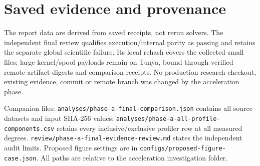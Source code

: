 \documentclass[11pt,a4paper]{article}
\begin{document}
\section{Saved evidence and provenance}
The report data are derived from saved receipts, not rerun solvers. The independent final review qualifies execution/internal parity as passing and retains the separate global scientific failure. Its local rehash covers the collected small files; large kernel/spool payloads remain on Tunya, bound through verified remote artifact digests and comparison receipts. No production research checkout, existing evidence, commit or remote branch was changed by the acceleration phase.

Companion files: \texttt{analyses/phase-a-final-comparison.json} contains all source datasets and input SHA-256 values; \texttt{analyses/phase-a-all-profile-components.csv} retains every inclusive/exclusive profiler row at all measured degrees. \texttt{review/phase-a-final-evidence-review.md} states the independent audit limits. Proposed figure settings are in \texttt{configs/proposed-figure-case.json}. All paths are relative to the acceleration investigation folder.
\end{document}
